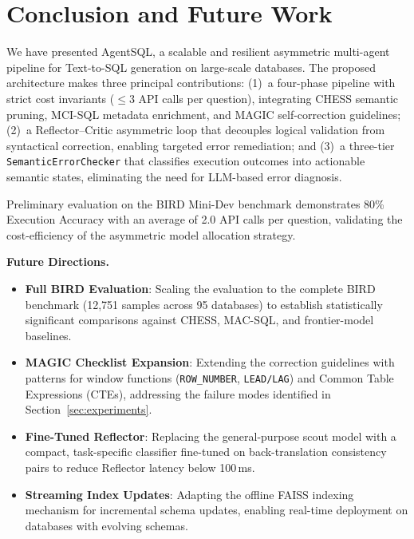 \section{Conclusion and Future Work}
\label{sec:conclusion}

We have presented AgentSQL, a scalable and resilient asymmetric multi-agent pipeline for Text-to-SQL generation on large-scale databases. The proposed architecture makes three principal contributions: (1)~a four-phase pipeline with strict cost invariants ($\leq 3$ API calls per question), integrating CHESS semantic pruning, MCI-SQL metadata enrichment, and MAGIC self-correction guidelines; (2)~a Reflector--Critic asymmetric loop that decouples logical validation from syntactical correction, enabling targeted error remediation; and (3)~a three-tier \texttt{SemanticErrorChecker} that classifies execution outcomes into actionable semantic states, eliminating the need for LLM-based error diagnosis.

Preliminary evaluation on the BIRD Mini-Dev benchmark demonstrates 80\% Execution Accuracy with an average of 2.0 API calls per question, validating the cost-efficiency of the asymmetric model allocation strategy.

\medskip
\noindent\textbf{Future Directions.}
\begin{itemize}
    \item \textbf{Full BIRD Evaluation}: Scaling the evaluation to the complete BIRD benchmark (12,751 samples across 95 databases) to establish statistically significant comparisons against CHESS, MAC-SQL, and frontier-model baselines.
    \item \textbf{MAGIC Checklist Expansion}: Extending the correction guidelines with patterns for window functions (\texttt{ROW\_NUMBER}, \texttt{LEAD/LAG}) and Common Table Expressions (CTEs), addressing the failure modes identified in Section~\ref{sec:experiments}.
    \item \textbf{Fine-Tuned Reflector}: Replacing the general-purpose scout model with a compact, task-specific classifier fine-tuned on back-translation consistency pairs to reduce Reflector latency below 100\,ms.
    \item \textbf{Streaming Index Updates}: Adapting the offline FAISS indexing mechanism for incremental schema updates, enabling real-time deployment on databases with evolving schemas.
\end{itemize}
